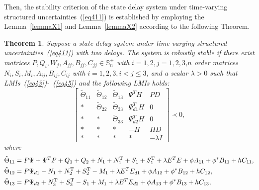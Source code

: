 \documentclass[a4paper]{cas-sc}
\newtheorem{theorem}{Theorem}
\begin{document}
Then, the stability criterion of the state delay system under time-varying structured uncertainties~(\ref{eq411}) is established by employing the Lemma~\ref{lemmaX1} and Lemma~\ref{lemmaX2} according to the following Theorem.

\begin{theorem}
  Suppose a state-delay system under time-varying structured uncertainties~(\ref{eq411}) with two delays. The system is robustly stable if there exist matrices $P,Q_i,W_j,A_{jj},B_{jj},C_{jj}\in\mathbb{S}_n^+$ with $i=1,2,j=1,2,3$,$n$ order matrices $N_i,S_i,M_i,A_{ij},B_{ij},C_{ij}$ with $i=1,2,3,i<j\le3$, and a scalar $\lambda>0$ such that LMIs~(\ref{eq43})-~(\ref{eq45}) and the following LMIs holds:
  \begin{equation}
    \left[ {\begin{array}{*{20}{c}}
            {{{\tilde \Theta }_{11}}} & {{{\tilde \Theta }_{12}}} & {{{\tilde \Theta }_{13}}} & {{\Psi ^T}H}    & {PD}           \\
            *                         & {{{\tilde \Theta }_{22}}} & {{{\tilde \Theta }_{23}}} & {\Psi _{d1}^TH} & 0              \\
            *                         & *                         & {{{\tilde \Theta }_{33}}} & {\Psi _{d2}^TH} & 0              \\
            *                         & *                         & *                         & { - H}          & {HD}           \\
            *                         & *                         & *                         & *               & { - \lambda I}
          \end{array}} \right] \prec 0,
    \label{eq412}
  \end{equation}
  where
  \begin{equation*}
    \begin{gathered}
      {{\tilde \Theta }_{11}} = P\Psi  + {\Psi ^T}P + {Q_1} + {Q_2} + {N_1} + N_1^{\text{T}} + {S_1} + S_1^{\text{T}} + \lambda {E^T}E + \phi {A_{11}} + {\phi ^*}{B_{11}} + h{C_{11}}, \hfill \\
      {{\tilde \Theta }_{12}} = P{\Psi _{d1}} - {N_1} + N_2^{\text{T}} + S_2^{\text{T}} - {M_1} + \lambda {E^T}{E_{d1}} + \phi {A_{12}} + {\phi ^*}{B_{12}} + h{C_{12}}, \hfill \\
      {{\tilde \Theta }_{13}} = P{\Psi _{d2}} + N_3^{\text{T}} + S_3^{\text{T}} - {S_1} + {M_1} + \lambda {E^T}{E_{d2}} + \phi {A_{13}} + {\phi ^*}{B_{13}} + h{C_{13}}, \hfill \\

\end{gathered}
\end{equation*}
\end{theorem}
\end{document}
